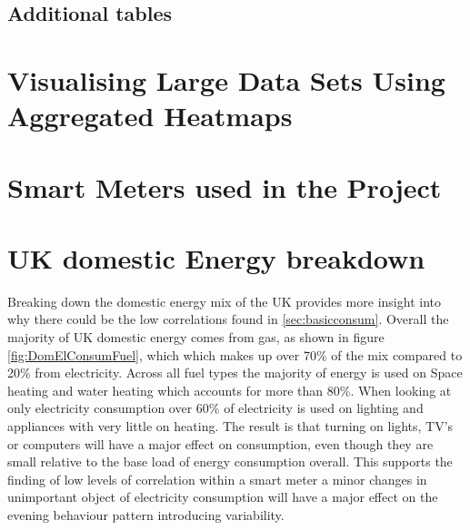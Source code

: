 \section{Additional tables}


\chapter{Visualising Large Data Sets Using Aggregated Heatmaps}
\label{app:heatmaps}



\chapter{Smart Meters used in the Project}
\label{app:smartmeters}

\chapter{UK domestic Energy breakdown}
\label{sec:Energybreakdown}
Breaking down the domestic energy mix of the UK \cite{domesticenergyv2pdfwithnotes2005} provides more insight into why there could be the low correlations found in \ref{sec:basicconsum}. Overall the majority of UK domestic energy comes from gas, as shown in figure \ref{fig:DomElConsumFuel}, which which makes up over 70\% of the mix compared to 20\% from electricity. Across all fuel types the majority of energy is used on Space heating and water heating which accounts for more than 80\%. When looking at only electricity consumption over 60\% of electricity is used on lighting and appliances with very little on heating. The result is that turning on lights, TV's or computers will have a major effect on consumption, even though they are small relative to the base load of energy consumption overall. This supports the finding of low levels of correlation within a smart meter a minor changes in unimportant object of electricity consumption will have a major effect on the evening behaviour pattern introducing variability.

